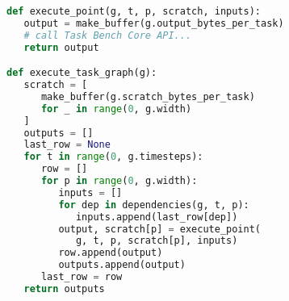 \begin{lstlisting}[language=Python,caption={Excerpt from Task Bench implementation in Dask.\label{lst:code-sample}},float]
def execute_point(g, t, p, scratch, inputs):
   output = make_buffer(g.output_bytes_per_task)
   # call Task Bench Core API...
   return output

def execute_task_graph(g):
   scratch = [
      make_buffer(g.scratch_bytes_per_task)
      for _ in range(0, g.width)
   ]
   outputs = []
   last_row = None
   for t in range(0, g.timesteps):
      row = []
      for p in range(0, g.width):
         inputs = []
         for dep in dependencies(g, t, p):
            inputs.append(last_row[dep])
         output, scratch[p] = execute_point(
            g, t, p, scratch[p], inputs)
         row.append(output)
         outputs.append(output)
      last_row = row
   return outputs
\end{lstlisting}
